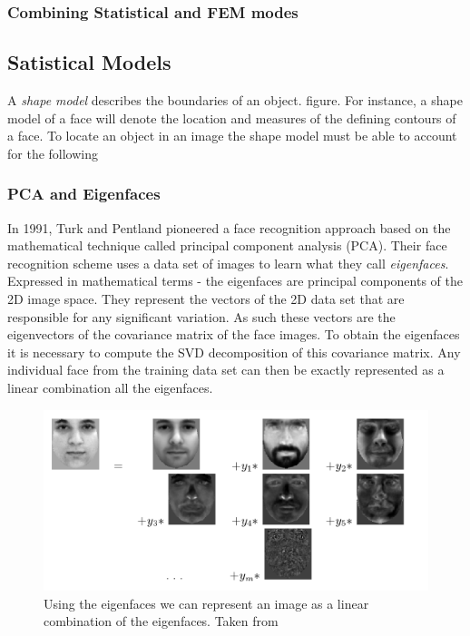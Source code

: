 \documentclass[11pt,a4paper]{report}
\begin{document}
\subsubsection{Combining Statistical and FEM modes}

\subsection{Satistical Models}
A \textit{shape model} describes the boundaries of an object. figure. For instance, a
shape model of a face will denote the location and measures of the defining
contours of a face. To locate an object in an image the shape model must be able to
account for the following

\subsubsection{PCA and Eigenfaces}
In 1991, Turk and Pentland \cite{eigenfaces91} pioneered a face recognition approach
based on the mathematical
technique called principal component analysis (PCA). Their face recognition
scheme uses a data set of images to learn what they call
\textit{eigenfaces}. Expressed in mathematical terms - the eigenfaces are principal components of the 2D image
space. They represent the vectors of the 2D data set that are responsible for any
significant variation. 
As such these vectors are the eigenvectors of the covariance matrix of the face
images. To obtain the eigenfaces it is necessary to compute the SVD decomposition of this
covariance matrix. Any individual face from the training data set can then be
exactly represented as a linear combination all the eigenfaces.

\begin{figure}[H]
\centering
\includegraphics[scale=0.5]{images/eigenfaces_comb_from_nn_vienna.png}
\caption{ Using the eigenfaces we can represent an image as a linear combination of the
  eigenfaces. Taken from \cite{vienna} }
\label{gr:eigenfaces}
\end{figure}
\end{document}
